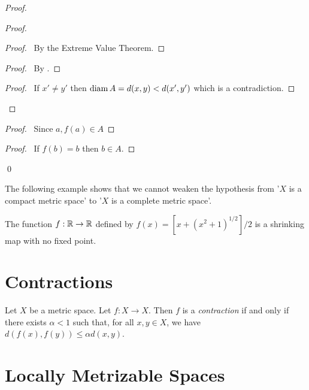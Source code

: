 \begin{proof}
    \begin{proof}
        \begin{proof}
            \pf\ By the Extreme Value Theorem.
        \end{proof}
        \begin{proof}
            \pf\ By .
        \end{proof}
        \begin{proof}
            \pf\ If $x' \neq y'$ then $\operatorname{diam} A = d(x,y) < d(x',y')$ which is
            a contradiction.
        \end{proof}
    \end{proof}
    \begin{proof}
        \pf\ Since $a, f(a) \in A$
    \end{proof}
    \begin{proof}
        \pf\ If $f(b) = b$ then $b \in A$.
    \end{proof}
    \qed
\end{proof}

The following example shows that we cannot weaken the hypothesis from '$X$ is
a compact metric space' to '$X$ is a complete metric space'.

\begin{example}
    The function $f : \mathbb{R} \rightarrow \mathbb{R}$ defined by
    $f(x) = [x + (x^2 + 1)^{1/2}] / 2$ is a shrinking map with no fixed point.
\end{example}

\section{Contractions}

\begin{definition}[Contraction]
    Let $X$ be a metric space. Let $f : X \rightarrow X$. Then $f$ is a
    \emph{contraction} if and only if there exists $\alpha < 1$ such that,
    for all $x, y \in X$, we have $d(f(x),f(y)) \leq \alpha d(x,y)$.
\end{definition}

\section{Locally Metrizable Spaces}

